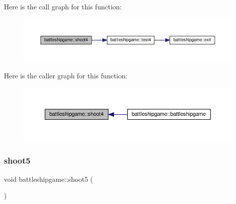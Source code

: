 Here is the call graph for this function\+:
\nopagebreak
\begin{figure}[H]
\begin{center}
\leavevmode
\includegraphics[width=350pt]{classbattleshipgame_aa660fbca945531186f483aed25c3f5d7_cgraph}
\end{center}
\end{figure}
Here is the caller graph for this function\+:
\nopagebreak
\begin{figure}[H]
\begin{center}
\leavevmode
\includegraphics[width=350pt]{classbattleshipgame_aa660fbca945531186f483aed25c3f5d7_icgraph}
\end{center}
\end{figure}
\mbox{\label{classbattleshipgame_a31f1aecdbcbff314bb1c36fd0af2691a}} 
\subsubsection{\texorpdfstring{shoot5}{shoot5}}
{\footnotesize\ttfamily void battleshipgame\+::shoot5 (\begin{DoxyParamCaption}{ }\end{DoxyParamCaption})\hspace{0.3cm}{\ttfamily [slot]}}

